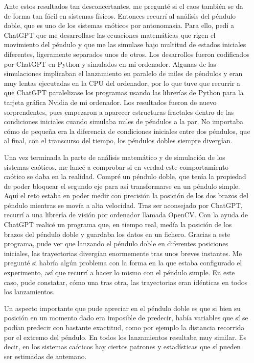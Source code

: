 \documentclass[
  11pt,
  a4paper,
  DIV=11,
  numbers=noendperiod]{scrreprt}
\begin{document}
Ante estos resultados tan desconcertantes, me pregunté si el caos
también se da de forma tan fácil en sistemas físicos. Entonces recurrí
al análisis del péndulo doble, que es uno de los sistemas caóticos por
antonomasia. Para ello, pedí a ChatGPT que me desarrollase las
ecuaciones matemáticas que rigen el movimiento del péndulo y que me las
simulase bajo multitud de estados iniciales diferentes, ligeramente
separados unos de otros. Los desarrollos fueron codificados por ChatGPT
en Python y simulados en mi ordenador. Algunas de las simulaciones
implicaban el lanzamiento en paralelo de miles de péndulos y eran muy
lentas ejecutadas en la CPU del ordenador, por lo que tuve que recurrir
a que ChatGPT paralelizase los programas usando las librerías de Python
para la tarjeta gráfica Nvidia de mi ordenador. Los resultados fueron de
nuevo sorprendentes, pues empezaron a aparecer estructuras fractales
dentro de las condiciones iniciales cuando simulaba miles de péndulos a
la par. No importaba cómo de pequeña era la diferencia de condiciones
iniciales entre dos péndulos, que al final, con el transcurso del
tiempo, los péndulos dobles siempre divergían.

Una vez terminada la parte de análisis matemático y de simulación de los
sistemas caóticos, me lancé a comprobar si en verdad este comportamiento
caótico se daba en la realidad. Compré un péndulo doble, que tenía la
propiedad de poder bloquear el segundo eje para así transformarse en un
péndulo simple. Aquí el reto estaba en poder medir con precisión la
posición de los dos brazos del péndulo mientras se movía a alta
velocidad. Tras ser aconsejado por ChatGPT, recurrí a una librería de
visión por ordenador llamada OpenCV. Con la ayuda de ChatGPT realicé un
programa que, en tiempo real, medía la posición de los brazos del
péndulo doble y guardaba los datos en un fichero. Gracias a este
programa, pude ver que lanzando el péndulo doble en diferentes
posiciones iniciales, las trayectorias divergían enormemente tras unos
breves instantes. Me pregunté si habría algún problema con la forma en
la que estaba configurado el experimento, así que recurrí a hacer lo
mismo con el péndulo simple. En este caso, pude constatar, cómo una tras
otra, las trayectorias eran idénticas en todos los lanzamientos.

Un aspecto importante que pude apreciar en el péndulo doble es que si
bien su posición en un momento dado era imposible de predecir, había
variables que sí se podían predecir con bastante exactitud, como por
ejemplo la distancia recorrida por el extremo del péndulo. En todos los
lanzamientos resultaba muy similar. Es decir, en los sistemas caóticos
hay ciertos patrones y estadísticas que sí pueden ser estimadas de
antemano.
\end{document}
